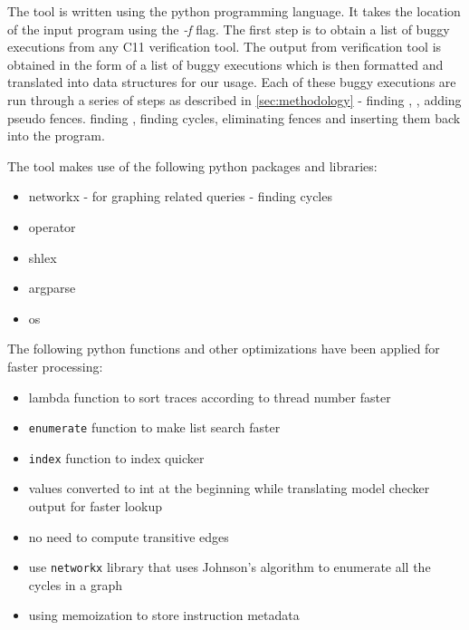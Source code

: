 \par
The tool is written using the python programming language. 
It takes the location of the input program using the \textit{-f} 
flag. The first step is to obtain a list of buggy executions 
from any C11 verification tool. 
The output from verification tool is obtained 
in the form of a list of buggy executions which is then formatted 
and translated into data structures for our usage. Each of these 
buggy executions are run through a series of steps as described in 
\textsection \ref{sec:methodology} - finding \lhb, \lmo, adding pseudo fences. 
finding \lto, finding cycles, eliminating fences and inserting them 
back into the program.

The tool makes use of the following python packages and libraries:
\begin{itemize}
	\item networkx - for graphing related queries - finding cycles 
	\item operator
	\item shlex
	\item argparse
	\item os
\end{itemize}

The following python functions and other optimizations have
been applied for faster processing:
\begin{itemize}
	\item lambda function to sort traces according to thread number faster
	\item \texttt{enumerate} function to make list search faster
	\item \texttt{index} function to index quicker
	\item values converted to int at the beginning while translating model checker output for faster lookup
	\item no need to compute transitive \sc edges
	\item use \texttt{networkx} library that uses Johnson's 
	algorithm to enumerate all the cycles in a graph
	\item using memoization to store instruction metadata
\end{itemize}


